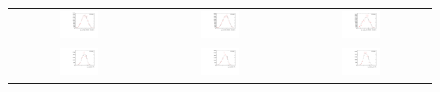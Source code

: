 \begin{figure}
\begin{tabular}{ccc}
\includegraphics[width=0.3\textwidth]{ANA_resources/Plots/Monte_carlo/data_vs_MC//Kpi/log10(D0K_IPCHI2_OWNPV)_2016.pdf} & \includegraphics[width=0.3\textwidth]{ANA_resources/Plots/Monte_carlo/data_vs_MC//Kpi/log10(D0Pi_IPCHI2_OWNPV)_2016.pdf} & \includegraphics[width=0.3\textwidth]{ANA_resources/Plots/Monte_carlo/data_vs_MC//Kpi/log10(KstarPi_IPCHI2_OWNPV)_2016.pdf} \\
\includegraphics[width=0.3\textwidth]{ANA_resources/Plots/Monte_carlo/data_vs_MC//Kpi/log10(D0K_PT)_2016.pdf} & \includegraphics[width=0.3\textwidth]{ANA_resources/Plots/Monte_carlo/data_vs_MC//Kpi/log10(D0Pi_PT)_2016.pdf} & \includegraphics[width=0.3\textwidth]{ANA_resources/Plots/Monte_carlo/data_vs_MC//Kpi/log10(KstarK_PT)_2016.pdf} \\

\end{tabular}
\end{figure}
